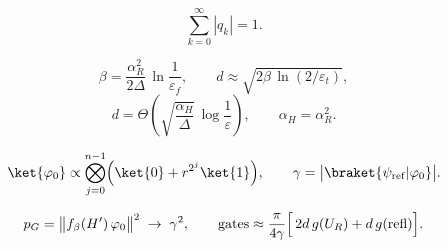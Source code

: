 \begin{proposition}
\label{prop:filter-normalisation}
\begin{equation}
    \sum_{k=0}^{\infty} |q_k| = 1 .
    \label{eq:filter-normalisation}
\end{equation}
\end{proposition}

\begin{equation}
    \beta = \frac{\alpha_R^2}{2\Delta}\,\ln\frac{1}{\varepsilon_f},
    \qquad
    d \approx \sqrt{2\beta\,\ln(2/\varepsilon_t)} ,
    \label{eq:qite-parameters}
\end{equation}
\begin{equation}
    d = \Theta\!\left(\sqrt{\frac{\alpha_H}{\Delta}}\,\log\frac{1}{\varepsilon}\right),
    \qquad
    \alpha_H = \alpha_R^2 .
    \label{eq:degree}
\end{equation}

\begin{equation}
    \ket{\varphi_0} \propto \bigotimes_{j=0}^{n-1}\Bigl(\ket{0} + r^{2^j}\ket{1}\Bigr),
    \qquad
    \gamma = \bigl|\braket{\psi_{\mathrm{ref}}|\varphi_0}\bigr| .
    \label{eq:geometric-state}
\end{equation}

\begin{equation}
    p_G = \bigl\|f_\beta(H')\,\varphi_0\bigr\|^2 \;\to\; \gamma^2,
    \qquad
    \text{gates} \approx \frac{\pi}{4\gamma}\Bigl[\,2d\,g(U_R) + d\,g(\text{refl})\Bigr] .
    \label{eq:qite-cost}
\end{equation}


